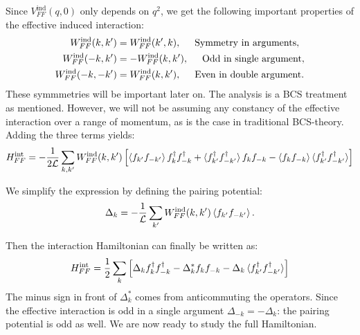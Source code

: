 Since $V^\text{ind}_{FF}(q,0)$ only depends on $q^2$, we get the following important properties of the effective induced interaction: 
\begin{align}
W^\text{ind}_{FF}(k,k') &= W^\text{ind}_{FF}(k',k), \hspace{0.5cm} \text{Symmetry in arguments}, \nonumber \\
W^\text{ind}_{FF}(-k,k') &= -W^\text{ind}_{FF}(k,k'), \hspace{0.5cm} \text{Odd in single argument}, \nonumber \\
W^\text{ind}_{FF}(-k,-k') &= W^\text{ind}_{FF}(k,k'), \hspace{0.5cm} \text{Even in double argument}.
\label{eq.EffectiveInteractionSymmetries}
\end{align}
These symmmetries will be important later on. The analysis is a BCS treatment as mentioned. However, we will not be assuming any constancy of the effective interaction over a range of momentum, as is the case in traditional BCS-theory\cite{Tinkham,LandauStatPhys2,PlischkeStatPhys}. Adding the three terms yields:
\begin{equation}
H^\text{int}_{FF} = -\frac{1}{2\mathcal{L}}\sum_{k,k'} W^\text{ind}_{FF}(k,k')\left[ \braket{ f_{k'}f_{-k'}} f^\dagger_k f^\dagger_{-k} + \braket {f^\dagger_{k'}f^\dagger_{-k'}} f_k f_{-k} - \braket {f_{k}f_{-k}} \braket {f^\dagger_{k'}f^\dagger_{-k'}} \right] \nonumber
\end{equation}

We simplify the expression by defining the pairing potential:
\begin{equation}
\Delta_k = -\frac{1}{\mathcal{L}}\sum_{k'}W^\text{ind}_{FF}(k,k')\braket {f_{k'}f_{-k'}}.
\label{eq.pairingpotentialdef}
\end{equation}

Then the interaction Hamiltonian can finally be written as:
\begin{equation}
H^\text{int}_{FF} = \frac{1}{2}\sum_{k} \left[ \Delta_k f^\dagger_k f^\dagger_{-k} - \Delta^*_k f_k f_{-k} - \Delta_k \braket {f^\dagger_{k'}f^\dagger_{-k'}} \right]
\label{eq.HFFintfinal}
\end{equation}
The minus sign in front of $\Delta^*_k$ comes from anticommuting the operators. Since the effective interaction is odd in a single argument $\Delta_{-k} = -\Delta_k$: the pairing potential is odd as well. We are now ready to study the full Hamiltonian.

